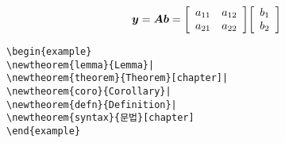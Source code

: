 \documentclass[11pt]{article}
\newenvironment{barray}[1]{\left[\begin{array}{#1}}{\end{array}\right]}
\begin{document}
$$\mbox{{\boldmath $y$}}=\mbox{{\boldmath $Ab$}} = \begin{barray}{cc} a_{11} & a_{12} \\ a_{21} & a_{22} \end{barray}
\begin{barray}{c} b_1 \\ b_2 \\ \end{barray}$$

\newenvironment{example}
{\vspace*{.6\baselineskip}\hrule\nopagebreak[4]
\begin{list}{}
{\setlength{\rightmargin}{.2in}}
\refstepcounter{excntr}
\item[예 \thechapter.\arabic{excntr}]}
{\vspace*{.6\baselineskip}\hrule\end{list}}

\begin{verbatim}
\begin{example}
\newtheorem{lemma}{Lemma}|
\newtheorem{theorem}{Theorem}[chapter]|
\newtheorem{coro}{Corollary}|
\newtheorem{defn}{Definition}|
\newtheorem{syntax}{문법}[chapter]
\end{example}
\end{verbatim}
\end{document}
